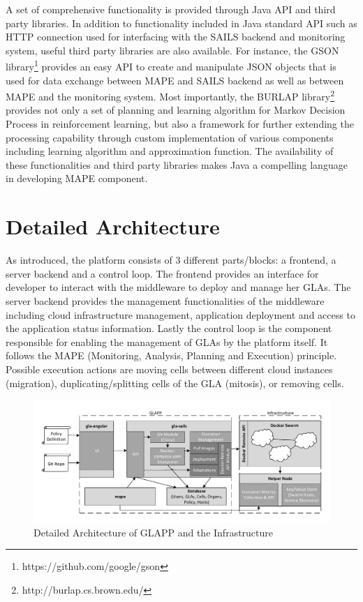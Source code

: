 \documentclass{seal_thesis}
\begin{document}
A set of comprehensive functionality is provided through Java API and third party libraries.
In addition to functionality included in Java standard API such as HTTP connection used for interfacing with the SAILS backend and monitoring system, useful third party libraries are also available.
For instance, the GSON library\footnote{https://github.com/google/gson} provides an easy API to create and manipulate JSON objects that is used for data exchange between MAPE and SAILS backend as well as between MAPE and the monitoring system.
Most importantly, the BURLAP library\footnote{http://burlap.cs.brown.edu/} provides not only a set of planning and learning algorithm for Markov Decision Process in reinforcement learning, but also a framework for further extending the processing capability through custom implementation of various components including learning algorithm and approximation function.
The availability of these functionalities and third party libraries makes Java a compelling language in developing MAPE component.


\section{Detailed Architecture}\label{sec:detailedArchitecture}
As introduced, the platform consists of 3 different parts/blocks: a frontend, a server backend and a control loop.
The frontend provides an interface for developer to interact with the middleware to deploy and manage her GLAs.
The server backend provides the management functionalities of the middleware including cloud infrastructure management, application deployment and access to the application status information.
Lastly the control loop is the component responsible for enabling the management of GLAs by the platform itself.
It follows the MAPE (Monitoring, Analysis, Planning and Execution) principle.
Possible execution actions are moving cells between different cloud instances (migration), duplicating/splitting cells of the GLA (mitosis), or removing cells.

\begin{figure}[!ht]
\centering
	\includegraphics[width=\textwidth]{detailed_architecture.pdf}
	\caption{Detailed Architecture of GLAPP and the Infrastructure}
	\label{fig:detailed}
\end{figure}
\end{document}
